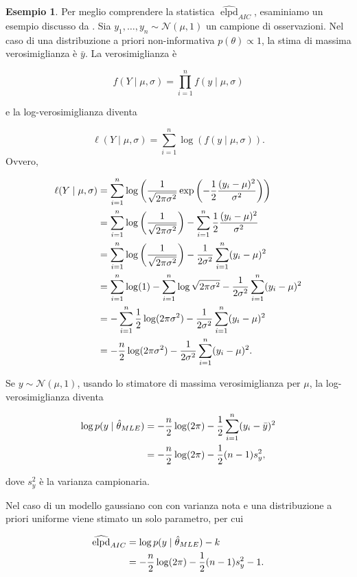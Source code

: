 \documentclass[
  11pt,
]{krantz}
\DeclareMathOperator{\elpd}{elpd} %
\theoremstyle{definition}
\theoremstyle{definition}
\newtheorem{example}{Esempio}[chapter]
\theoremstyle{definition}
\theoremstyle{definition}
\theoremstyle{remark}
\begin{document}
\begin{example}
Per meglio comprendere la statistica \(\widehat{\elpd}_{AIC}\), esaminiamo un esempio discusso da \citet{gelman2014understanding}. Sia \(y_1, \dots, y_n \sim \mathcal{N}(\mu, 1)\) un campione di osservazioni. Nel caso di una distribuzione a priori non-informativa \(p(\theta) \propto 1\), la stima di massima verosimiglianza è \(\bar{y}\). La verosimiglianza è

\[
f(Y \mid \mu, \sigma) = \prod_{i=1}^n f(y \mid \mu, \sigma)
\]

e la log-verosimiglianza diventa

\[
\ell(Y \mid \mu, \sigma) = \sum_{i=1}^n \log (f(y \mid \mu, \sigma)).
\] Ovvero,

\begin{align}
\ell(Y \mid \mu, \sigma) &= \sum_{i=1}^n \log \left( \frac {1}{{\sqrt {2\pi\sigma^2 }}}\exp \left(-{\frac {1}{2}}{\frac {(y_i-\mu )^{2}}{\sigma^{2}}}\right) \right)\notag\\
&= \sum_{i=1}^n \log \left( \frac {1}{{\sqrt {2\pi \sigma^2}}} \right) - \sum_{i=1}^n{\frac {1}{2}}{\frac {(y_i-\mu )^{2}}{\sigma ^{2}}} \notag\\
&= \sum_{i=1}^n \log \left( \frac {1}{{\sqrt {2\pi \sigma^2}}} \right) - \frac{1}{2\sigma^2}\sum_{i=1}^n (y_i-\mu )^{2} \notag \\
&= \sum_{i=1}^n \log (1) - \sum_{i=1}^n\log \sqrt{2\pi \sigma^2} - \frac{1}{2\sigma^2}\sum_{i=1}^n (y_i-\mu )^{2} \notag\\
&= - \sum_{i=1}^n\frac{1}{2}  \log (2\pi\sigma^2) - \frac{1}{2\sigma^2}\sum_{i=1}^n (y_i-\mu )^{2} \notag\\
&= - \frac{n}{2}  \log (2\pi\sigma^2) - \frac{1}{2\sigma^2}\sum_{i=1}^n (y_i-\mu )^{2}. \notag
\end{align}

Se \(y \sim \mathcal{N}(\mu, 1)\), usando lo stimatore di massima verosimiglianza per \(\mu\), la log-verosimiglianza diventa

\begin{align}
\log p(y \mid \hat{\theta}_{MLE}) &= -\frac{n}{2} \log (2\pi) - \frac{1}{2}\sum_{i=1}^n (y_i - \bar{y})^2 \notag\\
&= -\frac{n}{2} \log (2\pi) - \frac{1}{2} (n-1)s_y^2,
\end{align}

dove \(s_y^2\) è la varianza campionaria.

Nel caso di un modello gaussiano con con varianza nota e una distribuzione a priori uniforme viene stimato un solo parametro, per cui

\begin{align}
\widehat{\elpd}_{AIC} &= \log p(y \mid \hat{\theta}_{MLE}) - k \notag \\
&= -\frac{n}{2} \log (2\pi) - \frac{1}{2} (n-1)s_y^2 - 1.
\end{align}
\end{example}
\end{document}
